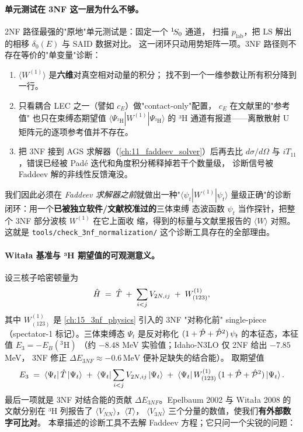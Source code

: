 \paragraph{单元测试在 3NF 这一层为什么不够。}
2NF 路径最强的"原地"单元测试是：固定一个 \({}^{1}\!S_{0}\) 通道，
扫描 \(p_{\text{lab}}\)，把 LS 解出的相移 \(\delta_0(E)\) 与 SAID 数据对比。
这一闭环只动用势矩阵一项。3NF 路径则不存在等价的"单变量"诊断：

\begin{enumerate}
  \item \(\langle W^{(1)} \rangle\) 是\textbf{六维}对真空相对动量的积分；
        找不到一个一维参数让所有积分降到一行。
  \item 只看耦合 LEC 之一（譬如 \(c_E\)）做"contact-only"配置，
        \(c_E\) 在文献里的"参考值" \cite{Epelbaum2002, Witala2008}
        也只在束缚态期望值 \(\langle\Psi_{^3\!\mathrm{H}}|W^{(1)}|\Psi_{^3\!\mathrm{H}}\rangle\)
        的 ³H 通道有报道——离散散射 U 矩阵元的逐项参考值并不存在。
  \item 把 3NF 接到 AGS 求解器（\cref{ch:11_faddeev_solver}）后再去比 \(d\sigma/d\Omega\)
        与 \(iT_{11}\)，错误已经被 Padé 迭代和角度积分稀释掉若干个数量级，
        诊断信号被 Faddeev 解的非线性反馈淹没。
\end{enumerate}

我们因此必须在 \emph{Faddeev 求解器之前}就做出一种"\(\langle\psi_t|W^{(1)}|\psi_t\rangle\)
量级正确"的诊断闭环：用一个\textbf{已被独立软件/文献校准过的}三体束缚
态波函数 \(\psi_t\) 当作探针，把整个 3NF 部分波核 \(W^{(1)}\) 在它上面收
缩，得到的标量与文献里报告的 \(\langle W \rangle\) 对照。这就是
\texttt{tools/check\_3nf\_normalization/} 这个诊断工具存在的全部理由。

\paragraph{Witała 基准与 ³H 期望值的可观测意义。}
设三核子哈密顿量为
\begin{equation}
\label{eq:ch17-H3N}
\hat{H} \;=\; \hat{T} \;+\; \sum_{i<j} V_{2N, ij} \;+\; W^{(1)}_{(123)},
\end{equation}
其中 \(W^{(1)}_{(123)}\) 是 \cref{ch:15_3nf_physics} 引入的 3NF "对称化前"
single-piece（spectator-1 标记）。三体束缚态 \(\Psi_t\) 是反对称化
\((1+\hat{\mathcal{P}}+\hat{\mathcal{P}}^2)\,\psi_t\) 的本征态，本征值 \(E_3 = -E_B(^3\!\mathrm{H})\)
（约 \(-8.48\) MeV 实验值；Idaho-N3LO 仅 2NF 给出 \(-7.85\) MeV，
3NF 修正 \(\Delta E_{3NF} \approx -0.6\,\mathrm{MeV}\) 便补足缺失的结合能）。
取期望值
\begin{equation}
\label{eq:ch17-energy-budget}
E_3 \;=\; \bra{\Psi_t}\hat{T}\ket{\Psi_t} \;+\;
          \bra{\Psi_t}\sum_{i<j} V_{2N, ij}\ket{\Psi_t} \;+\;
          \bra{\Psi_t}W^{(1)}_{(123)}\,(1+\hat{\mathcal{P}}+\hat{\mathcal{P}}^2)\ket{\Psi_t}.
\end{equation}
最后一项就是 3NF 对结合能的贡献 \(\Delta E_{3NF}\)。Epelbaum 2002 与
Witała 2008 的文献分别在 ³H 列报告了 \(\langle V_{NN}\rangle\)，\(\langle T \rangle\)，
\(\langle V_{3N}\rangle\) 三个分量的数值，使我们\textbf{有外部数字可比对}。
本章描述的诊断工具不去解 Faddeev 方程；它只问一个尖锐的问题：

